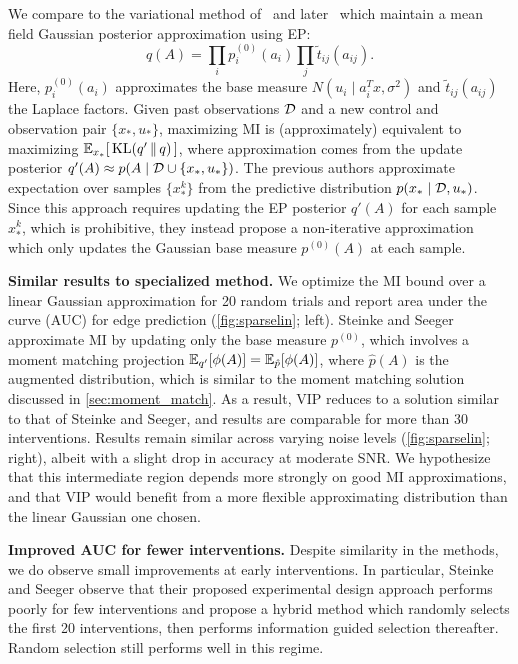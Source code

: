 We compare to the variational method of~\cite{steinke2007experimental}
and later~\cite{seeger2008bayesian} which maintain a mean field
Gaussian posterior approximation using EP:
\[
q(A) = \prod_i p_i^{(0)}(a_i) \prod_j \widetilde{t}_{ij}(a_{ij}).
\]
Here, $p^{(0)}_i(a_i)$ approximates the base measure \mbox{$N(u_i \mid
  a_i^T x, \sigma^2)$} and \mbox{$\widetilde{t}_{ij}(a_{ij})$} the
Laplace factors.  Given past observations $\mathcal{D}$ and a new control
and observation pair $\{x_*,u_*\}$, maximizing MI is (approximately)
equivalent to maximizing \mbox{$\mathbb{E}_{x_*}\!\left[\, \mathrm{KL}(q'\,\|\,q)
    \,\right]$},
where approximation comes from the update posterior \mbox{$q'(A)
  \approx p(A \mid \mathcal{D} \cup \{x_*,u_*\})$}.  The previous authors
approximate expectation over samples $\{x_{*}^{k}\}$ from the
predictive distribution $p(x_{*} \mid \mathcal{D}, u_{*})$.  Since this
approach requires updating the EP posterior $q'(A)$ for each sample
$x_{*}^k$, which is prohibitive, they instead propose a
non-iterative approximation which only updates the Gaussian base measure
$p^{(0)}(A)$ at each sample.

\textbf{Similar results to specialized method.} We optimize the MI
bound over a linear Gaussian approximation for 20 random trials and
report area under the curve (AUC) for edge prediction
(\FIG\ref{fig:sparselin}; left).  Steinke and Seeger approximate MI by
updating only the base measure $p^{(0)}$, which involves a moment
matching projection $\mathbb{E}_{q'}[ \phi(A) ] = \mathbb{E}_{\hat{p}}[ \phi(A) ]$,
where $\hat{p}(A)$ is the augmented distribution, which is similar to
the moment matching solution discussed in \SEC\ref{sec:moment_match}.
As a result, VIP reduces to a solution similar to that of Steinke and
Seeger, and results are comparable for more than 30 interventions.
Results remain similar across varying noise levels
(\FIG\ref{fig:sparselin}; right), albeit with a slight drop in
accuracy at moderate SNR.  We hypothesize that this intermediate
region depends more strongly on good MI approximations, and that VIP
would benefit from a more flexible approximating distribution than the
linear Gaussian one chosen.


\textbf{Improved AUC for fewer interventions.}  Despite similarity in
the methods, we do observe small improvements at early interventions.
In particular, Steinke and Seeger observe that their proposed
experimental design approach performs poorly for few interventions and
propose a hybrid method which randomly selects the first 20
interventions, then performs information guided selection thereafter.
Random selection still performs well in this regime.

